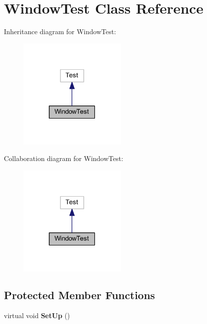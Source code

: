 \hypertarget{class_window_test}{}\section{Window\+Test Class Reference}
\label{class_window_test}


Inheritance diagram for Window\+Test\+:
\nopagebreak
\begin{figure}[H]
\begin{center}
\leavevmode
\includegraphics[width=150pt]{class_window_test__inherit__graph}
\end{center}
\end{figure}


Collaboration diagram for Window\+Test\+:
\nopagebreak
\begin{figure}[H]
\begin{center}
\leavevmode
\includegraphics[width=150pt]{class_window_test__coll__graph}
\end{center}
\end{figure}
\subsection*{Protected Member Functions}
\begin{DoxyCompactItemize}
\item 
\hypertarget{class_window_test_aef877f3405cf0e40a8c7e81fe47c3a7a}{}\label{class_window_test_aef877f3405cf0e40a8c7e81fe47c3a7a} 
virtual void {\bfseries Set\+Up} ()
\end{DoxyCompactItemize}
